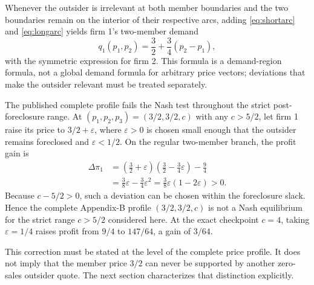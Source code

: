 Whenever the outsider is irrelevant at both member boundaries and the two boundaries remain on the interior of their respective arcs, adding \eqref{eq:shortarc} and \eqref{eq:longarc} yields firm 1's two-member demand
\begin{equation}\label{eq:duodemand}
 q_1(p_1,p_2)=\frac32+\frac34(p_2-p_1),
\end{equation}
with the symmetric expression for firm 2. This formula is a demand-region formula, not a global demand formula for arbitrary price vectors; deviations that make the outsider relevant must be treated separately.

The published complete profile fails the Nash test throughout the strict post-foreclosure range. At $(p_1,p_2,p_3)=(3/2,3/2,c)$ with any $c>5/2$, let firm 1 raise its price to $3/2+\varepsilon$, where $\varepsilon>0$ is chosen small enough that the outsider remains foreclosed and $\varepsilon<1/2$. On the regular two-member branch, the profit gain is
\begin{align}\label{eq:published-profile-gain}
 \Delta\pi_1
 &=\left(\frac32+\varepsilon\right)
   \left(\frac32-\frac34\varepsilon\right)-\frac94 \\
 &=\frac38\varepsilon-\frac34\varepsilon^2
 =\frac38\varepsilon(1-2\varepsilon)>0.
\end{align}
Because $c-5/2>0$, such a deviation can be chosen within the foreclosure slack. Hence the complete Appendix-B profile $(3/2,3/2,c)$ is not a Nash equilibrium for the strict range $c>5/2$ considered here. At the exact checkpoint $c=4$, taking $\varepsilon=1/4$ raises profit from $9/4$ to $147/64$, a gain of $3/64$.

This correction must be stated at the level of the complete price profile. It does not imply that the member price $3/2$ can never be supported by another zero-sales outsider quote. The next section characterizes that distinction explicitly.
